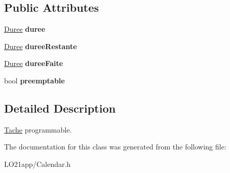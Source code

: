 \subsection*{Public Attributes}
\begin{DoxyCompactItemize}
\item 
\hypertarget{class_unitaire_afb536168ed579d6380142ab6d8afdff1}{}\hyperlink{class_t_i_m_e_1_1_duree}{Duree} {\bfseries duree}\label{class_unitaire_afb536168ed579d6380142ab6d8afdff1}

\item 
\hypertarget{class_unitaire_a2279ae0e8b3dd31b5cdd51e55fb882e3}{}\hyperlink{class_t_i_m_e_1_1_duree}{Duree} {\bfseries duree\+Restante}\label{class_unitaire_a2279ae0e8b3dd31b5cdd51e55fb882e3}

\item 
\hypertarget{class_unitaire_a48d055a358e530bdb46b226a9234bad6}{}\hyperlink{class_t_i_m_e_1_1_duree}{Duree} {\bfseries duree\+Faite}\label{class_unitaire_a48d055a358e530bdb46b226a9234bad6}

\item 
\hypertarget{class_unitaire_ab1e8bb26f23031559fcbcd7450820dc5}{}bool {\bfseries preemptable}\label{class_unitaire_ab1e8bb26f23031559fcbcd7450820dc5}

\end{DoxyCompactItemize}


\subsection{Detailed Description}
\hyperlink{class_tache}{Tache} programmable. 

The documentation for this class was generated from the following file\+:\begin{DoxyCompactItemize}
\item 
L\+O21app/Calendar.\+h\end{DoxyCompactItemize}
